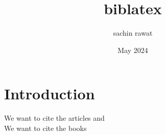 \documentclass{article}
\title{biblatex}
\author{sachin rawat}
\date{May 2024}
\begin{document}
\maketitle
\section{Introduction}

We want to cite the articles \cite{smith2010} and \cite{johnson2015} \\
We want to cite the books \parencite{bob2012,williams2018}


\printbibliography[title = Articles, type = article]
\printbibliography[title = Books, type = book]
\end{document}

